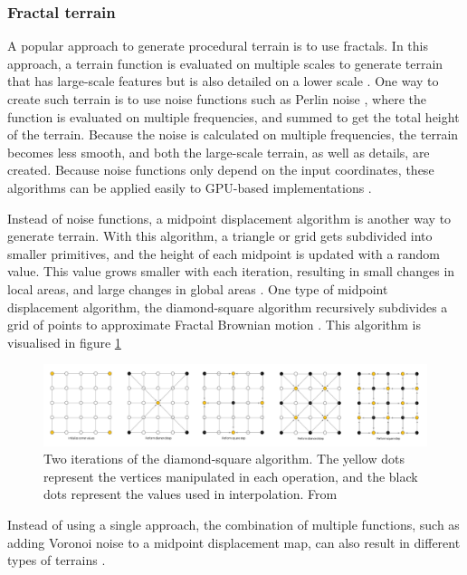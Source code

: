 \documentclass{article}
\begin{document}
\subsubsection{Fractal terrain} 
A popular approach to generate procedural terrain is to use fractals. In this approach, a terrain function is evaluated on multiple scales to generate terrain that has large-scale features but is also detailed on a lower scale \cite{shaker_procedural_2016}. One way to create such terrain is to use noise functions such as Perlin noise \cite{musgrave_synthesis_1989}, where the function is evaluated on multiple frequencies, and summed to get the total height of the terrain. Because the noise is calculated on multiple frequencies, the terrain becomes less smooth, and both the large-scale terrain, as well as details, are created. 
Because noise functions only depend on the input coordinates, these algorithms can be applied easily to GPU-based implementations \cite{schneider_real-time_2006}. 

Instead of noise functions, a midpoint displacement algorithm is another way to generate terrain. With this algorithm, a triangle or grid gets subdivided into smaller primitives, and the height of each midpoint is updated with a random value. This value grows smaller with each iteration, resulting in small changes in local areas, and large changes in global areas \cite{sala_mathematics_nodate}. One type of midpoint displacement algorithm, the diamond-square algorithm recursively subdivides a grid of points to approximate Fractal Brownian motion \cite{miller_definition_1986}. This algorithm is visualised in figure \ref{fig:diamond_square}

\begin{figure}
    \centering
    \includegraphics[width=\textwidth]{figures/Diamond_Square}
    \caption{Two iterations of the diamond-square algorithm. The yellow dots represent the vertices manipulated in each operation, and the black dots represent the values used in interpolation. From \cite{ewin_by_nodate}}
    \label{fig:diamond_square}
\end{figure}

Instead of using a single approach, the combination of multiple functions, such as adding Voronoi noise to a midpoint displacement map, can also result in different types of terrains \cite{olsen_realtime_2004}.
\end{document}
